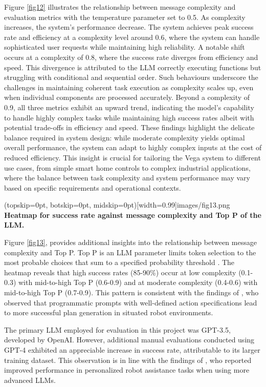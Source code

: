 \documentclass{ieeeaccess}
\begin{document}
Figure \ref{fig12} illustrates the relationship between message complexity and evaluation metrics with the temperature parameter set to 0.5. As complexity increases, the system's performance decrease. The system achieves peak success rate and efficiency at a complexity level around 0.6, where the system can handle sophisticated user requests while maintaining high reliability. A notable shift occurs at a complexity of 0.8, where the success rate diverges from efficiency and speed. This divergence is attributed to the LLM correctly executing functions but struggling with conditional and sequential order. Such behaviours underscore the challenges in maintaining coherent task execution as complexity scales up, even when individual components are processed accurately. Beyond a complexity of 0.9, all three metrics exhibit an upward trend, indicating the model's capability to handle highly complex tasks while maintaining high success rates albeit with potential trade-offs in efficiency and speed. These findings highlight the delicate balance required in system design: while moderate complexity yields optimal overall performance, the system can adapt to highly complex inputs at the cost of reduced efficiency. This insight is crucial for tailoring the Vega system to different use cases, from simple smart home controls to complex industrial applications, where the balance between task complexity and system performance may vary based on specific requirements and operational contexts. 

\Figure[h!](topskip=0pt, botskip=0pt,
midskip=0pt)[width=0.99\columnwidth]{{images/fig13.png}}
{ \textbf{Heatmap for success rate against message complexity and Top P of the LLM.}\label{fig13}}

Figure \ref{fig13}, provides additional insights into the relationship between message complexity and Top P. Top P is an LLM parameter limits token selection to the most probable choices that sum to a specified probability threshold \cite{rum2024setting}. The heatmap reveals that high success rates (85-90\%) occur at low complexity (0.1-0.3) with mid-to-high Top P (0.6-0.9) and at moderate complexity (0.4-0.6) with mid-to-high Top P (0.7-0.9). This pattern is consistent with the findings of \citet{Singh2023}, who observed that programmatic prompts with well-defined action specifications lead to more successful plan generation in situated robot environments.

The primary LLM employed for evaluation in this project was GPT-3.5, developed by OpenAI. However, additional manual evaluations conducted using GPT-4 exhibited an appreciable increase in success rate, attributable to its larger training dataset. This observation is in line with the findings of \citet{Wu2023}, who reported improved performance in personalized robot assistance tasks when using more advanced LLMs.
\end{document}
